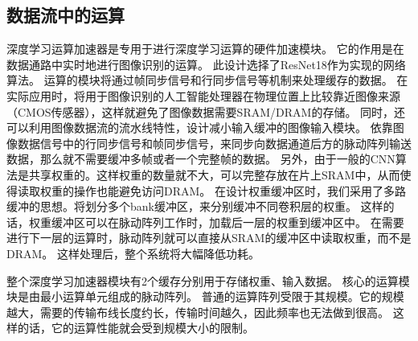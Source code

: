 \subsection{数据流中的运算}
深度学习运算加速器是专用于进行深度学习运算的硬件加速模块。
它的作用是在数据通路中实时地进行图像识别的运算。
此设计选择了ResNet18作为实现的网络算法。
运算的模块将通过帧同步信号和行同步信号等机制来处理缓存的数据。
在实际应用时，将用于图像识别的人工智能处理器在物理位置上比较靠近图像来源（CMOS传感器），这样就避免了图像数据需要SRAM/DRAM的存储。
同时，还可以利用图像数据流的流水线特性，设计减小输入缓冲的图像输入模块。
依靠图像数据信号中的行同步信号和帧同步信号，来同步向数据通道后方的脉动阵列输送数据，那么就不需要缓冲多帧或者一个完整帧的数据。
另外，由于一般的CNN算法是共享权重的。这样权重的数量就不大，可以完整存放在片上SRAM中，从而使得读取权重的操作也能避免访问DRAM。
在设计权重缓冲区时，我们采用了多路缓冲的思想。将划分多个bank缓冲区，来分别缓冲不同卷积层的权重。
这样的话，权重缓冲区可以在脉动阵列工作时，加载后一层的权重到缓冲区中。
在需要进行下一层的运算时，脉动阵列就可以直接从SRAM的缓冲区中读取权重，而不是DRAM。
这样处理后，整个系统将大幅降低功耗。

整个深度学习加速器模块有2个缓存分别用于存储权重、输入数据。
核心的运算模块是由最小运算单元组成的脉动阵列。
普通的运算阵列受限于其规模。它的规模越大，需要的传输布线长度约长，传输时间越久，因此频率也无法做到很高。
这样的话，它的运算性能就会受到规模大小的限制。



